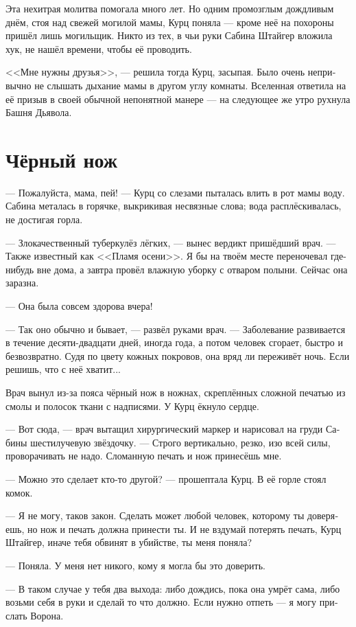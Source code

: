 \documentclass[a4paper,10pt,fleqn]{book}\usepackage{polyglossia}\setdefaultlanguage[babelshorthands=true]{russian}\setotherlanguage{english}\defaultfontfeatures{Ligatures=TeX,Mapping=tex-text}\usepackage{xcolor}\newcommand{\ml}[3]{#2}
\begin{document}
Эта нехитрая молитва помогала много лет.
Но одним промозглым дождливым днём, стоя над свежей могилой мамы, Курц поняла --- кроме неё на похороны пришёл лишь могильщик.
Никто из тех, в чьи руки Сабина Штайгер вложила хук, не нашёл времени, чтобы её проводить.

<<Мне нужны друзья>>, --- решила тогда Курц, засыпая.
Было очень непривычно не слышать дыхание мамы в другом углу комнаты.
Вселенная ответила на её призыв в своей обычной непонятной манере --- на следующее же утро рухнула Башня Дьявола.

\section{Чёрный нож}

--- Пожалуйста, мама, пей! --- Курц со слезами пыталась влить в рот мамы воду.
Сабина металась в горячке, выкрикивая несвязные слова;
вода расплёскивалась, не достигая горла.

--- Злокачественный туберкулёз лёгких, --- вынес вердикт пришёдший врач.
--- Также известный как <<Пламя осени>>.
Я бы на твоём месте переночевал где-нибудь вне дома, а завтра провёл влажную уборку с отваром полыни.
Сейчас она заразна.

--- Она была совсем здорова вчера!

--- Так оно обычно и бывает, --- развёл руками врач.
--- Заболевание развивается в течение десяти-двадцати дней, иногда года, а потом человек сгорает, быстро и безвозвратно.
Судя по цвету кожных покровов, она вряд ли переживёт ночь.
Если решишь, что с неё хватит...

Врач вынул из-за пояса чёрный нож в ножнах, скреплённых сложной печатью из смолы и полосок ткани с надписями.
У Курц ёкнуло сердце.

--- Вот сюда, --- врач вытащил хирургический маркер и нарисовал на груди Сабины шестилучевую звёздочку.
--- Строго вертикально, резко, изо всей силы, проворачивать не надо.
Сломанную печать и нож принесёшь мне.

--- Можно это сделает кто-то другой? --- прошептала Курц.
В её горле стоял комок.

--- Я не могу, таков закон.
Сделать может любой человек, которому ты доверяешь, но нож и печать должна принести ты.
И не вздумай потерять печать, Курц Штайгер, иначе тебя обвинят в убийстве, ты меня поняла?

--- Поняла.
У меня нет никого, кому я могла бы это доверить.

--- В таком случае у тебя два выхода: либо дождись, пока она умрёт сама, либо возьми себя в руки и сделай то что должно.
\ml{$0$}
{Если нужно отпеть --- я могу прислать Ворона.}
{If she needs last rites, I'll send the Raben.''}
\end{document}
